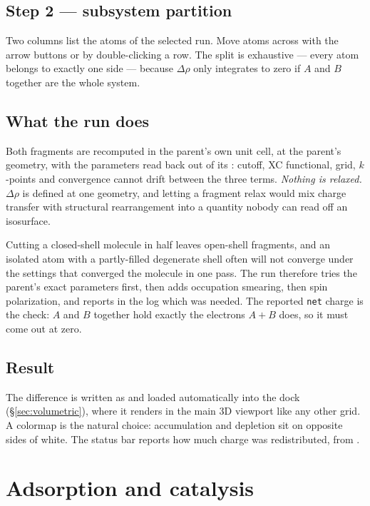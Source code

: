 \subsection{Step 2 --- subsystem partition}

Two columns list the atoms of the selected run. Move atoms across with the
arrow buttons or by double-clicking a row. The split is exhaustive --- every
atom belongs to exactly one side --- because $\Delta\rho$ only integrates to
zero if $A$ and $B$ together are the whole system.

\subsection{What the run does}

Both fragments are recomputed in the parent's own unit cell, at the parent's
geometry, with the parameters read back out of its : cutoff, XC
functional, grid, $k$-points and convergence cannot drift between the three
terms. \emph{Nothing is relaxed.} $\Delta\rho$ is defined at one geometry, and
letting a fragment relax would mix charge transfer with structural
rearrangement into a quantity nobody can read off an isosurface.

\begin{calnote}
Cutting a closed-shell molecule in half leaves open-shell fragments, and an
isolated atom with a partly-filled degenerate shell often will not converge
under the settings that converged the molecule in one pass. The run therefore
tries the parent's exact parameters first, then adds occupation smearing, then
spin polarization, and reports in the log which was needed. The reported
\texttt{net} charge is the check: $A$ and $B$ together hold exactly the
electrons $A{+}B$ does, so it must come out at zero.
\end{calnote}

\subsection{Result}

The difference is written as  and loaded automatically into the
 dock (\S\ref{sec:volumetric}), where it renders in the
main 3D viewport like any other grid. A  colormap is the natural
choice: accumulation and depletion sit on opposite sides of white. The status
bar reports how much charge was redistributed, from .

\section{Adsorption and catalysis}
\label{sec:adsorption}

